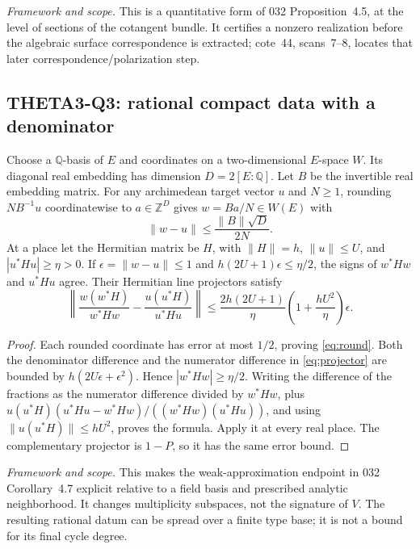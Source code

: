 \documentclass[11pt]{article}
\newcommand{\Q}{\mathbb Q}\newcommand{\C}{\mathbb C}\newcommand{\Z}{\mathbb Z}\newcommand{\R}{\mathbb R}\newcommand{\A}{\mathbb A}\newcommand{\OO}{\mathcal O}
\newcommand{\framework}[1]{\par\smallskip\noindent\textit{Framework and scope.} #1\par}
\theoremstyle{definition}\newtheorem{definition}[theorem]{Definition}\newtheorem{remark}[theorem]{Remark}
\begin{document}
\framework{This is a quantitative form of 032 Proposition~4.5, at the level of sections of the cotangent bundle. It certifies a nonzero realization before the algebraic surface correspondence is extracted; cote~44, scans~7--8, locates that later correspondence/polarization step.}

\subsection{THETA3-Q3: rational compact data with a denominator}\label{Q3}
Choose a $\Q$-basis of $E$ and coordinates on a two-dimensional $E$-space $W$. Its diagonal real embedding has dimension $D=2[E:\Q]$. Let $B$ be the invertible real embedding matrix. For any archimedean target vector $u$ and $N\geq1$, rounding $NB^{-1}u$ coordinatewise to $a\in\Z^D$ gives $w=Ba/N\in W(E)$ with
\begin{equation}\label{eq:round}
 \|w-u\|\leq\frac{\|B\|\sqrt D}{2N}.
\end{equation}
At a place let the Hermitian matrix be $H$, with $\|H\|=h$, $\|u\|\leq U$, and $|u^*Hu|\geq\eta>0$. If $\epsilon=\|w-u\|\leq1$ and
$h(2U+1)\epsilon\leq\eta/2$, the signs of $w^*Hw$ and $u^*Hu$ agree. Their Hermitian line projectors satisfy
\begin{equation}\label{eq:projector}
 \left\|\frac{w(w^*H)}{w^*Hw}-\frac{u(u^*H)}{u^*Hu}\right\|
 \leq \frac{2h(2U+1)}{\eta}
       \left(1+\frac{hU^2}{\eta}\right)\epsilon.
\end{equation}
\begin{proof}
Each rounded coordinate has error at most $1/2$, proving \eqref{eq:round}. Both the denominator difference and the numerator difference in \eqref{eq:projector} are bounded by
$h(2U\epsilon+\epsilon^2)$. Hence $|w^*Hw|\geq\eta/2$. Writing the difference of the fractions as the numerator difference divided by $w^*Hw$, plus
$u(u^*H)(u^*Hu-w^*Hw)/((w^*Hw)(u^*Hu))$, and using
$\|u(u^*H)\|\leq hU^2$, proves the formula. Apply it at every real place. The complementary projector is $1-P$, so it has the same error bound.
\end{proof}
\framework{This makes the weak-approximation endpoint in 032 Corollary~4.7 explicit relative to a field basis and prescribed analytic neighborhood. It changes multiplicity subspaces, not the signature of $V$. The resulting rational datum can be spread over a finite type base; it is not a bound for its final cycle degree.}
\end{document}
